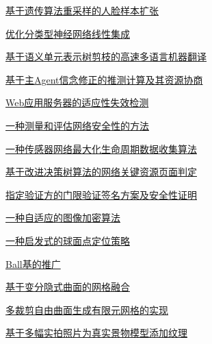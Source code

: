 \documentclass[a4paper]{article}
\begin{document}
\href{http://www.jos.org.cn/ch/reader/download_pdf.aspx?file_no=20051105&year_id=2005&quarter_id=11&falg=1}{基于遗传算法重采样的人脸样本扩张}

\href{http://www.jos.org.cn/ch/reader/download_pdf.aspx?file_no=20051106&year_id=2005&quarter_id=11&falg=1}{优化分类型神经网络线性集成}

\href{http://www.jos.org.cn/ch/reader/download_pdf.aspx?file_no=20051107&year_id=2005&quarter_id=11&falg=1}{基于语义单元表示树剪枝的高速多语言机器翻译}

\href{http://www.jos.org.cn/ch/reader/download_pdf.aspx?file_no=20051108&year_id=2005&quarter_id=11&falg=1}{基于主Agent信念修正的推测计算及其资源协商}

\href{http://www.jos.org.cn/ch/reader/download_pdf.aspx?file_no=20051109&year_id=2005&quarter_id=11&falg=1}{Web应用服务器的适应性失效检测}

\href{http://www.jos.org.cn/ch/reader/download_pdf.aspx?file_no=20051110&year_id=2005&quarter_id=11&falg=1}{一种测量和评估网络安全性的方法}

\href{http://www.jos.org.cn/ch/reader/download_pdf.aspx?file_no=20051111&year_id=2005&quarter_id=11&falg=1}{一种传感器网络最大化生命周期数据收集算法}

\href{http://www.jos.org.cn/ch/reader/download_pdf.aspx?file_no=20051112&year_id=2005&quarter_id=11&falg=1}{基于改进决策树算法的网络关键资源页面判定}

\href{http://www.jos.org.cn/ch/reader/download_pdf.aspx?file_no=20051113&year_id=2005&quarter_id=11&falg=1}{指定验证方的门限验证签名方案及安全性证明}

\href{http://www.jos.org.cn/ch/reader/download_pdf.aspx?file_no=20051114&year_id=2005&quarter_id=11&falg=1}{一种自适应的图像加密算法}

\href{http://www.jos.org.cn/ch/reader/download_pdf.aspx?file_no=20051115&year_id=2005&quarter_id=11&falg=1}{一种启发式的球面点定位策略}

\href{http://www.jos.org.cn/ch/reader/download_pdf.aspx?file_no=20051116&year_id=2005&quarter_id=11&falg=1}{Ball基的推广}

\href{http://www.jos.org.cn/ch/reader/download_pdf.aspx?file_no=20051117&year_id=2005&quarter_id=11&falg=1}{基于变分隐式曲面的网格融合}

\href{http://www.jos.org.cn/ch/reader/download_pdf.aspx?file_no=20051118&year_id=2005&quarter_id=11&falg=1}{多裁剪自由曲面生成有限元网格的实现}

\href{http://www.jos.org.cn/ch/reader/download_pdf.aspx?file_no=20051119&year_id=2005&quarter_id=11&falg=1}{基于多幅实拍照片为真实景物模型添加纹理}
\end{document}
